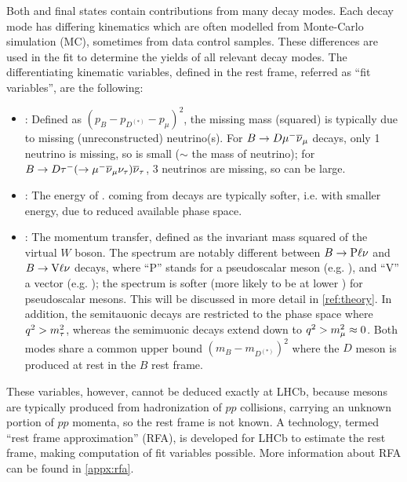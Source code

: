 Both \Dstarp\mun and \Dz\mun final states contain contributions from many decay
modes.
Each decay mode has differing kinematics
which are often modelled from Monte-Carlo simulation (MC),
sometimes from data control samples.
These differences are used in the fit to determine the yields of all
relevant decay modes.
The differentiating kinematic variables, defined in the \B rest frame,
referred as ``fit variables'',
are the following:
\begin{itemize}
    \item \mmSq: Defined as $(p_B - p_{D^{(*)}} - p_\mu)^2$,
        the missing mass (squared) is typically due to missing (unreconstructed)
        neutrino(s).
        For $B \rightarrow D {\mu^-} {{\overline{\nu}}_\mu}$ decays, only 1 neutrino is missing,
        so \mmSq is small ($\sim$ the mass of neutrino);
        for $B \rightarrow D {\tau^-} (\rightarrow {\ensuremath{\mu^-}}{\ensuremath{{\overline{\nu}}_\mu}}{\ensuremath{{\nu}_\tau}}) {{\overline{\nu}}_\tau}$,
        3 neutrinos are missing, so \mmSq can be large.
    \item \el: The energy of \mun. \mun coming from \taum decays are typically
        softer, i.e. with smaller energy, due to reduced available phase space.
    \item \qSq: The momentum transfer, defined as the invariant mass squared
        of the virtual $W$ boson.
        The \qSq spectrum are notably different between
        $B \rightarrow \text{P} \ell{\ensuremath{\nu}}$ and $B \rightarrow \text{V} \ell{\ensuremath{\nu}}$
        decays, where ``P'' stands for a pseudoscalar meson (e.g. \Dz),
        and ``V'' a vector (e.g. \Dstar);
        the \qSq spectrum is softer
        (more likely to be at lower \qSq) for pseudoscalar mesons.
        This will be discussed in more detail in \cref{ref:theory}.
        In addition, the semitauonic decays are restricted to the phase space
        where $q^2 > m^2_\tau$,
        whereas the semimuonic decays extend down to $q^2 > m^2_\mu \approx 0$.
        Both modes share a common \qSq upper bound $(m_B - m_{D^{(*)}})^2$
        where the $D$ meson is produced at rest in the $B$ rest frame.
\end{itemize}
These variables, however, cannot be deduced exactly at LHCb,
because \B mesons
are typically produced from hadronization of $pp$ collisions,
carrying an unknown portion of $pp$ momenta,
so the \B rest frame is not known.
A technology, termed ``rest frame approximation'' (RFA), is developed for LHCb
to estimate the \B rest frame, making computation of fit variables possible.
More information about RFA can be found in \cref{appx:rfa}.

